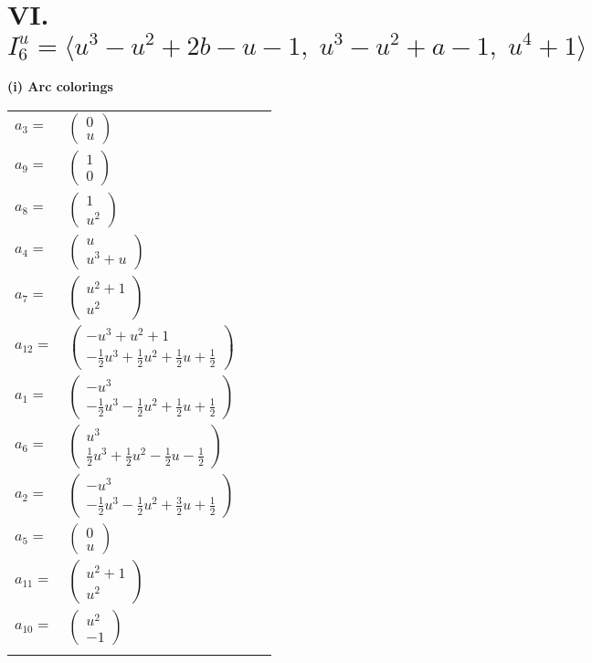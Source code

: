 \documentclass[1p]{elsarticle_modified}
\theoremstyle{definition}
\begin{document}
\centering \section*{VI. $I^u_{6}= \langle u^3- u^2+2 b- u-1,\;u^3- u^2+a-1,\;u^4+1 \rangle$}
\flushleft \textbf{(i) Arc colorings}\\
\begin{tabular}{m{7pt} m{180pt} m{7pt} m{180pt} }
\flushright $a_{3}=$&$\begin{pmatrix}0\\u\end{pmatrix}$ \\
\flushright $a_{9}=$&$\begin{pmatrix}1\\0\end{pmatrix}$ \\
\flushright $a_{8}=$&$\begin{pmatrix}1\\u^2\end{pmatrix}$ \\
\flushright $a_{4}=$&$\begin{pmatrix}u\\u^3+u\end{pmatrix}$ \\
\flushright $a_{7}=$&$\begin{pmatrix}u^2+1\\u^2\end{pmatrix}$ \\
\flushright $a_{12}=$&$\begin{pmatrix}- u^3+u^2+1\\-\frac{1}{2} u^3+\frac{1}{2} u^2+\frac{1}{2} u+\frac{1}{2}\end{pmatrix}$ \\
\flushright $a_{1}=$&$\begin{pmatrix}- u^3\\-\frac{1}{2} u^3-\frac{1}{2} u^2+\frac{1}{2} u+\frac{1}{2}\end{pmatrix}$ \\
\flushright $a_{6}=$&$\begin{pmatrix}u^3\\\frac{1}{2} u^3+\frac{1}{2} u^2-\frac{1}{2} u-\frac{1}{2}\end{pmatrix}$ \\
\flushright $a_{2}=$&$\begin{pmatrix}- u^3\\-\frac{1}{2} u^3-\frac{1}{2} u^2+\frac{3}{2} u+\frac{1}{2}\end{pmatrix}$ \\
\flushright $a_{5}=$&$\begin{pmatrix}0\\u\end{pmatrix}$ \\
\flushright $a_{11}=$&$\begin{pmatrix}u^2+1\\u^2\end{pmatrix}$ \\
\flushright $a_{10}=$&$\begin{pmatrix}u^2\\-1\end{pmatrix}$\\&\end{tabular}
\end{document}
